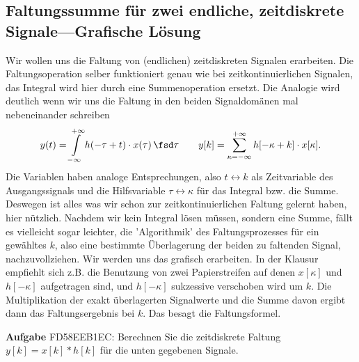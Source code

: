 \clearpage
\subsection{Faltungssumme für zwei endliche, zeitdiskrete Signale---Grafische Lösung}
\label{sec:FD58EEB1EC}
\begin{Ziel}
Wir wollen uns die Faltung von (endlichen) zeitdiskreten Signalen erarbeiten.
Die Faltungsoperation selber funktioniert genau wie bei zeitkontinuierlichen
Signalen, das Integral wird hier durch eine Summenoperation ersetzt.
Die Analogie wird deutlich wenn wir uns die Faltung in den beiden
Signaldomänen mal nebeneinander schreiben
\begin{align}
y(t) = \int\limits_{-\infty}^{+\infty} h(-\tau+t) \cdot x(\tau) \, \fsd \tau\qquad
y[k] = \sum\limits_{\kappa = -\infty}^{+\infty} h[-\kappa+k] \cdot x[\kappa].
\end{align}
Die Variablen haben analoge Entsprechungen, also $t \leftrightarrow k$ als
Zeitvariable des Ausgangssignals und
die Hilfsvariable $\tau \leftrightarrow \kappa$ für das Integral bzw. die Summe.
%
Deswegen ist alles was wir schon zur zeitkontinuierlichen Faltung gelernt haben,
hier nützlich.
%
Nachdem wir kein Integral lösen müssen, sondern eine Summe,
fällt es vielleicht sogar leichter, die 'Algorithmik' des Faltungsprozesses
für ein gewähltes $k$, also eine bestimmte Überlagerung der beiden zu faltenden
Signal, nachzuvollziehen.
%
Wir werden uns das grafisch erarbeiten. In der Klausur empfiehlt sich z.B.
die Benutzung von zwei Papierstreifen auf denen $x[\kappa]$ und $h[-\kappa]$
aufgetragen sind, und $h[-\kappa]$ sukzessive verschoben wird um $k$. Die
Multiplikation der exakt überlagerten Signalwerte und die Summe davon ergibt
dann das Faltungsergebnis bei $k$. Das besagt die Faltungsformel.
\end{Ziel}
\textbf{Aufgabe} {\tiny FD58EEB1EC}: Berechnen Sie die zeitdiskrete Faltung
$y[k] = x[k] \ast h[k]$ für die unten gegebenen Signale.
%
\begin{center}
\end{center}
